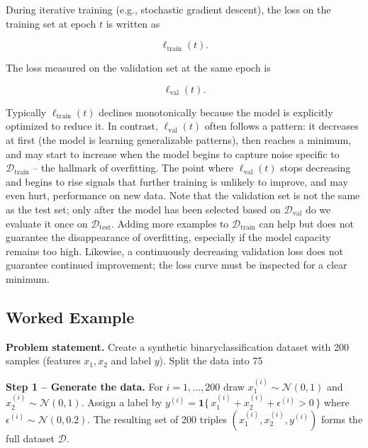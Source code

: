 \documentclass[12pt, a4paper]{article}
\begin{document}
During iterative training (e.g., stochastic gradient descent), the loss on the training set at epoch \(t\) is written as  

\[
\ell_{\text{train}}(t).
\]

The loss measured on the validation set at the same epoch is  

\[
\ell_{\text{val}}(t).
\]

Typically \(\ell_{\text{train}}(t)\) declines monotonically because the model is explicitly optimized to reduce it. In contrast, \(\ell_{\text{val}}(t)\) often follows a pattern: it decreases at first (the model is learning generalizable patterns), then reaches a minimum, and may start to increase when the model begins to capture noise specific to \(\mathcal{D}_{\text{train}}\) -- the hallmark of overfitting. The point where \(\ell_{\text{val}}(t)\) stops decreasing and begins to rise signals that further training is unlikely to improve, and may even hurt, performance on new data. Note that the validation set is not the same as the test set; only after the model has been selected based on \(\mathcal{D}_{\text{val}}\) do we evaluate it once on \(\mathcal{D}_{\text{test}}\). Adding more examples to \(\mathcal{D}_{\text{train}}\) can help but does not guarantee the disappearance of overfitting, especially if the model capacity remains too high. Likewise, a continuously decreasing validation loss does not guarantee continued improvement; the loss curve must be inspected for a clear minimum.

\subsection{Worked Example}
\textbf{Problem statement.}  
Create a synthetic binaryclassification dataset with 200 samples (features \(x_1, x_2\) and label \(y\)). Split the data into 75 %

\textbf{Step 1 -- Generate the data.}  
For \(i=1,\dots,200\) draw \(x_{1}^{(i)}\sim\mathcal{N}(0,1)\) and \(x_{2}^{(i)}\sim\mathcal{N}(0,1)\).  
Assign a label by \(y^{(i)} = \mathbf{1}\{\,x_{1}^{(i)}+x_{2}^{(i)}+ \epsilon^{(i)} > 0\,\}\) where \(\epsilon^{(i)}\sim\mathcal{N}(0,0.2)\).  
The resulting set of 200 triples \((x_{1}^{(i)},x_{2}^{(i)},y^{(i)})\) forms the full dataset \(\mathcal{D}\).
\end{document}
